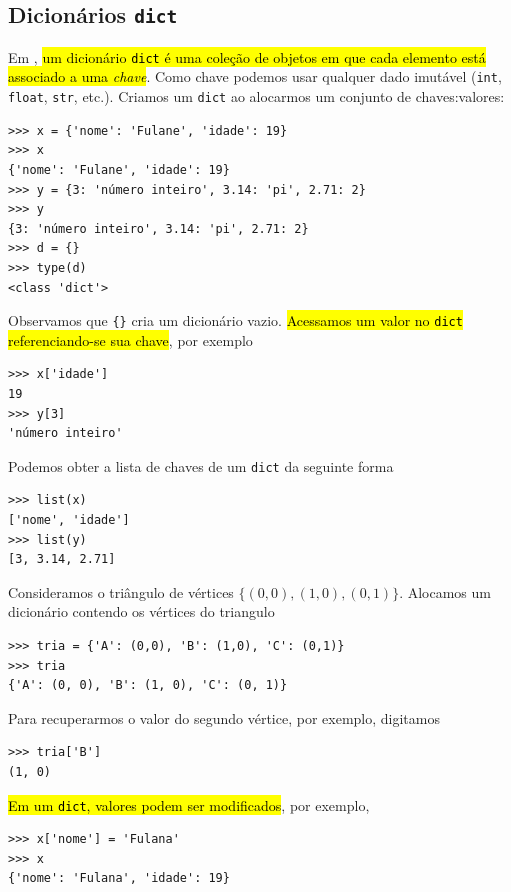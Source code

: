 \subsection{Dicionários \texttt{dict}}

Em {\python}, \hl{um dicionário \texttt{dict} é uma coleção de objetos em que cada elemento está associado a uma \emph{chave}}. Como chave podemos usar qualquer dado imutável (\lstinline+int+, \lstinline+float+, \lstinline+str+, etc.). Criamos um \lstinline+dict+ ao alocarmos um conjunto de chaves:valores:

\begin{lstlisting}
>>> x = {'nome': 'Fulane', 'idade': 19}
>>> x
{'nome': 'Fulane', 'idade': 19}
>>> y = {3: 'número inteiro', 3.14: 'pi', 2.71: 2}
>>> y
{3: 'número inteiro', 3.14: 'pi', 2.71: 2}
>>> d = {}
>>> type(d)
<class 'dict'>
\end{lstlisting}

Observamos que \lstinline+{}+ cria um dicionário vazio. \hl{Acessamos um valor no \texttt{dict} referenciando-se sua chave}, por exemplo

\begin{lstlisting}
>>> x['idade']
19
>>> y[3]
'número inteiro'
\end{lstlisting}
Podemos obter a lista de chaves de um \lstinline+dict+ da seguinte forma
\begin{lstlisting}
>>> list(x)
['nome', 'idade']
>>> list(y)
[3, 3.14, 2.71]
\end{lstlisting}

\begin{ex}\label{cap_lingua_sec_colecao:ex:tria0}
Consideramos o triângulo de vértices $\{(0,0), (1,0), (0,1)\}$. Alocamos um dicionário contendo os vértices do triangulo

\begin{lstlisting}
>>> tria = {'A': (0,0), 'B': (1,0), 'C': (0,1)}
>>> tria
{'A': (0, 0), 'B': (1, 0), 'C': (0, 1)}
\end{lstlisting}

Para recuperarmos o valor do segundo vértice, por exemplo, digitamos

\begin{lstlisting}
>>> tria['B']
(1, 0)
\end{lstlisting}

\end{ex}

\hl{Em um \texttt{dict}, valores podem ser modificados}, por exemplo,

\begin{lstlisting}
>>> x['nome'] = 'Fulana'
>>> x
{'nome': 'Fulana', 'idade': 19}
\end{lstlisting}


